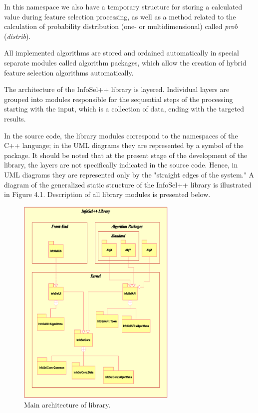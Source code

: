 \documentclass[a4paper,fleqn]{report}
\begin{document}
In this namespace we also have a temporary structure for storing a calculated value during 
feature selection processing, as well as a method related to the calculation 
of probability distribution (one- or multidimensional) called {\it prob} ({\it distrib}). 

All implemented algorithms are stored and ordained automatically in 
special separate modules called algorithm packages, which allow the creation of hybrid feature selection algorithms  automatically.%

The architecture of the InfoSel++ library is layered. Individual layers are grouped into modules responsible for the 
sequential steps of the processing starting with the input, which is a collection of data, ending with the targeted results.

In the source code, the library modules correspond to the namespaces of the C++ language;
in the UML diagrams they are represented by a symbol of the package. 
It should be noted that at the present stage of the development of the library, the layers are not specifically 
indicated in the source code. Hence, in UML diagrams they are represented only by the "straight edges of the system."
A diagram of the generalized static structure of the InfoSel++ library is illustrated in Figure 4.1. %
Description of all library modules is presented below.

\begin{figure}[!h] %
  \begin{center}
    \includegraphics[width=3in]{./figs/Lib-mainstrukture.eps}
  \end{center}
  \label{piclibmainstrukture}
  \caption{\small Main architecture of library.}
\end{figure}
\end{document}
